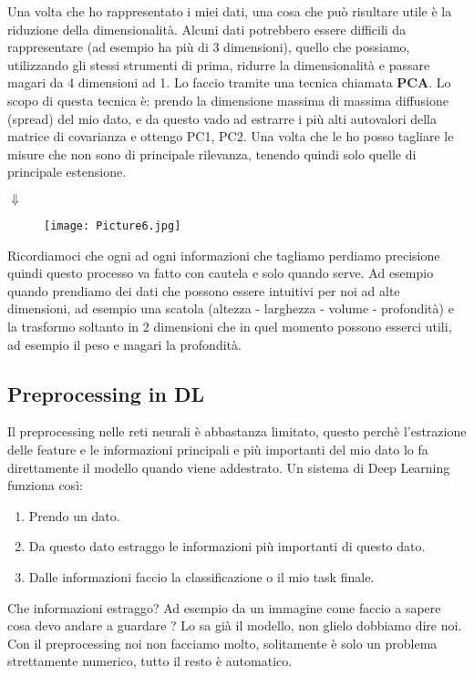 \documentclass[a4paper,12pt]{article}
\begin{document}
Una volta che ho rappresentato i miei dati, una cosa che può risultare utile è la riduzione della dimensionalità. Alcuni dati
potrebbero essere difficili da rappresentare (ad esempio ha più di 3 dimensioni), quello che possiamo, utilizzando gli stessi strumenti di prima, ridurre la dimensionalità e passare
magari da 4 dimensioni ad 1. Lo faccio tramite una tecnica chiamata \textbf{PCA}. Lo scopo di questa tecnica è: prendo la dimensione massima di massima diffusione (spread) del mio dato,
e da questo vado ad estrarre i più alti autovalori della matrice di covarianza e ottengo PC1, PC2. Una volta che le ho posso tagliare le misure che non sono 
di principale rilevanza, tenendo quindi solo quelle di principale estensione.
\begin{center}
    $\Downarrow$
\end{center}
\begin{figure}[H]
    \centering
    \texttt{[image: Picture6.jpg]}
    \label{etichetta31}
\end{figure}
Ricordiamoci che ogni ad ogni informazioni che tagliamo perdiamo precisione quindi questo processo va fatto con cautela e solo quando serve. Ad esempio quando prendiamo dei dati che possono essere intuitivi per noi ad alte dimensioni,
ad esempio una scatola (altezza - larghezza - volume - profondità) e la trasformo soltanto in 2 dimensioni che in quel momento possono esserci utili, ad esempio il peso e magari la profondità.

\newpage
\subsection{Preprocessing in DL}
Il preprocessing nelle reti neurali è abbastanza limitato, questo perchè l'estrazione delle feature e le informazioni principali e più importanti del mio dato lo fa direttamente il modello quando viene addestrato.
Un sistema di Deep Learning funziona così:
\begin{enumerate}
    \item Prendo un dato.
    \item Da questo dato estraggo le informazioni più importanti di questo dato.
    \item Dalle informazioni faccio la classificazione o il mio task finale.
\end{enumerate}
Che informazioni estraggo? Ad esempio da un immagine come faccio a sapere cosa devo andare a guardare ? Lo sa già il modello, non glielo dobbiamo dire noi.
Con il preprocessing noi non facciamo molto, solitamente è solo un problema strettamente numerico, tutto il resto è automatico.
\end{document}
